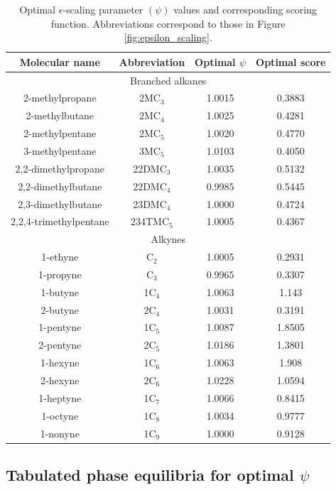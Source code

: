 \documentclass[journal=jctc,manuscript=article]{achemso}
\begin{document}
\begin{table}[htb!]
	\caption{Optimal $\epsilon$-scaling parameter $(\psi)$ values and corresponding scoring function. Abbreviations correspond to those in Figure \ref{fig:epsilon_scaling}.}
	\begin{center}
		\begin{tabular}{|c|c|c|c|}
			\hline
			Molecular name & Abbreviation & Optimal $\psi$ & Optimal score \\ \hline
			\multicolumn{4}{|c|}{Branched alkanes} \\ \hline
			2-methylpropane & 2MC$_3$ & 1.0015 & 0.3883 \\
			2-methylbutane & 2MC$_4$ & 1.0025 & 0.4281 \\
			2-methylpentane & 2MC$_5$ & 1.0020 & 0.4770 \\
			3-methylpentane & 3MC$_5$ & 1.0103 & 0.4050 \\
			2,2-dimethylpropane & 22DMC$_3$ & 1.0035 & 0.5132 \\
			2,2-dimethylbutane & 22DMC$_4$ & 0.9985 & 0.5445 \\
			2,3-dimethylbutane & 23DMC$_4$ & 1.0000 & 0.4724 \\
			2,2,4-trimethylpentane & 234TMC$_5$ & 1.0005 & 0.4367 \\ \hline	
			\multicolumn{4}{|c|}{Alkynes} \\ \hline
			1-ethyne & C$_2$ & 1.0005 & 0.2931 \\
			1-propyne & C$_3$ & 0.9965 & 0.3307 \\
			1-butyne & 1C$_4$ & 1.0063 & 1.143 \\
			2-butyne & 2C$_4$ & 1.0031 & 0.3191 \\
			1-pentyne & 1C$_5$ & 1.0087 & 1.8505 \\
			2-pentyne & 2C$_5$ & 1.0186 & 1.3801 \\
			1-hexyne & 1C$_6$ & 1.0063 & 1.908 \\
			2-hexyne & 2C$_6$ & 1.0228 & 1.0594 \\
			1-heptyne & 1C$_7$ & 1.0066 & 0.8415 \\
			1-octyne & 1C$_8$ & 1.0034 & 0.9777 \\
			1-nonyne & 1C$_9$ & 1.0000 & 0.9128 \\
			\hline
		\end{tabular}
	\end{center}
\end{table}

\newpage
\clearpage

\subsection{Tabulated phase equilibria for optimal $\psi$}
\end{document}
